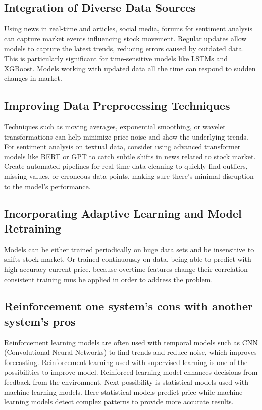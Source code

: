 \documentclass[10pt,twoside,english,a4paper]{article}
\begin{document}
\subsection{Integration of Diverse Data Sources}
Using news in real-time and articles, social media, forums for sentiment analysis can capture market events influencing stock movement. Regular updates allow models to capture the latest trends, reducing errors caused by outdated data. This is particularly significant for time-sensitive models like LSTMs and XGBoost. Models working with updated data all the time can respond to sudden changes in market.\cite{diverse_datsrc}
\subsection{Improving Data Preprocessing Techniques}
Techniques such as moving averages, exponential smoothing, or wavelet transformations can help minimize price noise and show the underlying trends.
For sentiment analysis on textual data, consider using advanced transformer models like BERT or GPT to catch subtle shifts in news related to stock market.
Create automated pipelines for real-time data cleaning to quickly find outliers, missing values, or erroneous data points, making sure there's minimal disruption to the model's performance.
\subsection{Incorporating Adaptive Learning and Model Retraining}
Models can be either trained periodically on huge data sets and be insensitive to shifts stock market. Or trained continuously on data. being able to predict with high accuracy current price. because overtime features change their correlation consistent training mus be applied in order to address the problem.\cite{adaptive_learning} 
\subsection{Reinforcement one system's cons with another system's pros}
Reinforcement learning models are often used with temporal models such as CNN (Convolutional Neural Networks) to find trends and reduce noise, which improves forecasting. Reinforcement learning used with supervised learning is one of the possibilities to improve model. Reinforced-learning model enhances decisions from feedback from the environment. Next possibility is statistical models used with machine learning models. Here statistical models predict price while machine learning models detect complex patterns to provide more accurate results.\cite{reinfocment}
\end{document}
